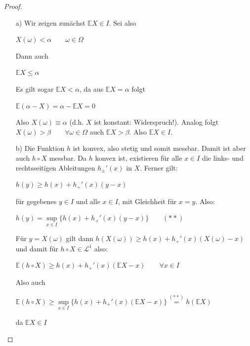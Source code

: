 \documentclass[10pt,a4paper]{report}
\numberwithin{equation}{section}
\numberwithin{figure}{section}
\theoremstyle{plain}
\theoremstyle{definition}
\theoremstyle{remark}
\theoremstyle{plain}
\newcommand{\1}{ \mathbb{1} } %
\begin{document}
\begin{proof} \ 
  \begin{itemize}
  \item[a)] Wir zeigen zunächst $\mathbb{E}X \in I$. Sei also
    \begin{center}
      $X(\omega)< \alpha \qquad \omega \in \Omega$
    \end{center}
    Dann auch
    \begin{center}
      $\mathbb{E}X\leq \alpha$
    \end{center}
    Es gilt sogar $\mathbb{E}X < \alpha$, da aus $\mathbb{E}X=\alpha$
    folgt
    \begin{center}
      $\mathbb{E}(\alpha-X)=\alpha-\mathbb{E}X=0$
    \end{center}
    Also $X(\omega)\equiv \alpha$ (d.h. $X$ ist konstant: Widerspruch!). Analog folgt $X(\omega)>\beta \qquad \forall \omega \in \Omega$ auch $\mathbb{E}X> \beta$. Also $\mathbb{E}X \in I$.
  \item[b)] Die Funktion $h$ ist konvex, also stetig und somit
    messbar. Damit ist aber auch $h\circ X$ messbar. Da $h$ konvex
    ist, existieren für alle $x \in I$ die links- und rechtsseitigen
    Ableitungen $h_\pm'(x)$ in $X$. Ferner gilt:
    \begin{center}
      $h(y)\geq h(x)+h_+'(x)(y-x)$
    \end{center}
    für gegebenes $y \in I$ und alle $x \in I$, mit Gleichheit für
    $x=y$. Also:
    \begin{center}
      $h(y)=\sup\limits_{x \in I}\{h(x)+h_+'(x)(y-x)\} \qquad (**)$
    \end{center}
    Für $y=X(\omega)$ gilt dann $h(X(\omega))\geq h(x)+h_+'(x)(X(\omega)-x)$ und damit für $h\circ X \in \mathcal{L}^1$ also:
    \begin{center}
      $\mathbb{E}(h\circ X) \geq h(x)+h_+'(x)(\mathbb{E}X-x) \qquad
      \forall x \in I$
    \end{center}
    Also auch
    \begin{center}
      $\mathbb{E}(h\circ X)\geq \sup\limits_{x \in
        I}\{h(x)+h_+'(x)(\mathbb{E}X-x)\}\overset{(**)}{=}h(\mathbb{E}X)$
    \end{center}
    da $\mathbb{E}X\in I$
  \end{itemize}
\end{proof}
\end{document}
